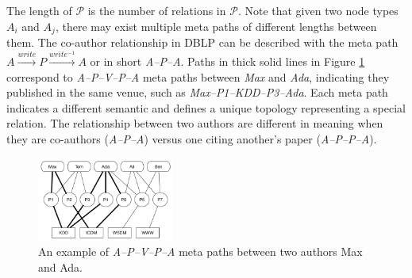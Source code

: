 The length of $\mathcal{P}$ is the number of relations in $\mathcal{P}$. Note that given two node types $A_i$ and $A_j$, there may exist multiple meta paths of different lengths between them.
The co-author relationship in DBLP can be described with the meta path $A\xrightarrow{write}P\xrightarrow{write^{-1}}A$ or in short \textit{A--P--A}. Paths in thick solid lines in Figure \ref{sampleNetwork} correspond to \textit{A--P--V--P--A} meta paths between \textit{Max} and \textit{Ada}, indicating they published in the same venue, such as \textit{Max--P1--KDD--P3--Ada}. %
Each meta path indicates a different semantic and defines a unique topology representing a special relation. The relationship between two authors are different in meaning when they are co-authors (\textit{A--P--A}) versus one citing another's paper (\textit{A--P--P--A}).

\begin{figure}[t]
  \centering
      \includegraphics[width=0.4\textwidth]{figs/exampleSocialNetwork.pdf}
  \caption{An example of \textit{A--P--V--P--A} meta paths between two authors Max and Ada.}\label{sampleNetwork}
\end{figure}




